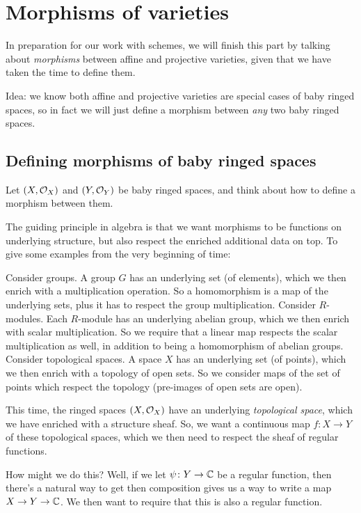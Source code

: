 \chapter{Morphisms of varieties}
In preparation for our work with schemes,
we will finish this part by talking about \emph{morphisms}
between affine and projective varieties,
given that we have taken the time to define them.

Idea: we know both affine and projective varieties are special
cases of baby ringed spaces, so in fact we will just define a morphism
between \emph{any} two baby ringed spaces.

\section{Defining morphisms of baby ringed spaces}
Let $(X, \mathcal O_X)$ and $(Y, \mathcal O_Y)$ be baby ringed spaces, and think
about how to define a morphism between them.

The guiding principle in algebra is that we want morphisms
to be functions on underlying structure, but also respect
the enriched additional data on top.
To give some examples from the very beginning of time:
\begin{example}
	\listhack
	\begin{itemize}
	\ii Consider groups.
	A group $G$ has an underlying set (of elements),
	which we then enrich with a multiplication operation.
	So a homomorphism is a map of the underlying sets,
	plus it has to respect the group multiplication.
	\ii Consider $R$-modules.
	Each $R$-module has an underlying abelian group,
	which we then enrich with scalar multiplication.
	So we require that a linear map respects the scalar multiplication as well,
	in addition to being a homomorphism of abelian groups.
	\ii Consider topological spaces.
	A space $X$ has an underlying set (of points),
	which we then enrich with a topology of open sets.
	So we consider maps of the set of points
	which respect the topology (pre-images of open sets are open).
	\end{itemize}
\end{example}
This time, the ringed spaces $(X, \mathcal O_X)$ have an underlying
\emph{topological space}, which we have enriched with a structure sheaf.
So, we want a continuous map $f \colon X \to Y$ of these topological spaces,
which we then need to respect the sheaf of regular functions.

How might we do this? Well, if we let $\psi \colon Y \to \mathbb C$
be a regular function, then there's a natural way to get
then composition gives us a way to write a map $X \to Y \to \mathbb C$.
We then want to require that this is also a regular function.

